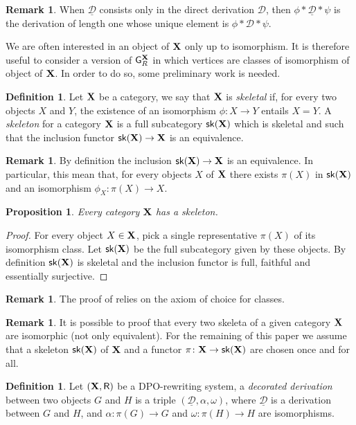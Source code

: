 \documentclass[a4paper]{article}
\def\R{\mathsf{R}}
\def\X{\textbf {\textup{X}}}
\newcommand{\ske}{\mathsf{sk}(\X)}
\newcommand{\dder}[1]{\mathscr{#1}}
\newcommand{\der}[1]{\underline{\dder{#1}}}
\def\gpo{\mathsf{G}^{\X}_R}
\newtheorem{proposition}[theorem]{Proposition}
\theoremstyle{definition}
\newtheorem{definition}[theorem]{Definition}
\newtheorem{remark}[theorem]{Remark}
\begin{document}
\begin{remark}
When $\der{D}$ consists only in the direct derivation $\dder{D}$, then $\phi*\der{D}*\psi$ is the derivation of length one whose unique element is $\phi*\dder{D}*\psi$.
\end{remark}

We are often interested in an object of $\X$ only up to isomorphism. It is therefore useful to consider a version of $\gpo$ in which vertices are classes of isomorphism of object of $\X$. In order to do so, some preliminary work is needed.

\begin{definition}\cite{mac2013categories}
Let $\X$ be a category, we say that  $\X$ is \emph{skeletal} if, for every two objects $X$ and $Y$, the existence of an isomorphism $\phi\colon X\to Y$ entails $X=Y$. A \emph{skeleton} for a category $\X$ is a full subcategory $\ske$ which is skeletal and such that the inclusion functor $\ske\to \X$ is an equivalence. 
\end{definition}

\begin{remark}
By definition the inclusion $\ske \to \X$ is an equivalence. In particular, this mean that, for every objects $X$ of $\X$ there exists $\pi(X)$ in $\ske$ and an isomorphism $\phi_X\colon \pi(X) \to X$.
\end{remark}

\begin{proposition}\label{prop:ske}
	Every category $\X$ has a skeleton. 
\end{proposition}
\begin{proof}
	For every object $X\in \X$, pick a single representative $\pi(X)$ of its isomorphism class. Let $\ske$ be the full subcategory given by these objects. By definition $\ske$ is skeletal and the inclusion functor is full, faithful and essentially surjective.\qedhere 
\end{proof}
\begin{remark}
	The proof of  relies on the axiom of choice for classes.
	\end{remark}
\begin{remark}
	It is possible to proof that every two skeleta of a given category $\X$ are isomorphic (not only equivalent). For the remaining of this paper we assume that a skeleton $\ske$ of $\X$ and a functor $\pi\colon \X\to \ske$ are chosen once and for all.
\end{remark}

\begin{definition}
	Let $(\X, \R)$ be a DPO-rewriting system, a \emph{decorated derivation} between two objects $G$ and $H$ is a triple $(\der{D}, \alpha, \omega)$, where $\der{D}$ is a derivation between $G$ and $H$, and $\alpha\colon \pi(G)\to G$ and $\omega\colon \pi(H)\to H$ are isomorphisms.
\end{definition}
\end{document}
